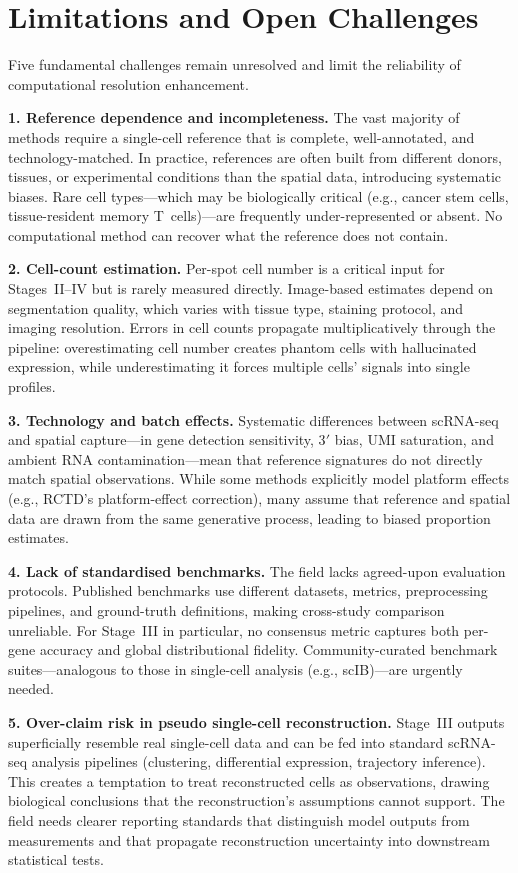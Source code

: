 \section{Limitations and Open Challenges}
\label{sec:limitations}

Five fundamental challenges remain unresolved and limit the reliability of computational resolution enhancement.

\textbf{1. Reference dependence and incompleteness.}
The vast majority of methods require a single-cell reference that is complete, well-annotated, and technology-matched. In practice, references are often built from different donors, tissues, or experimental conditions than the spatial data, introducing systematic biases. Rare cell types---which may be biologically critical (e.g., cancer stem cells, tissue-resident memory T~cells)---are frequently under-represented or absent. No computational method can recover what the reference does not contain.

\textbf{2. Cell-count estimation.}
Per-spot cell number is a critical input for Stages~II--IV but is rarely measured directly. Image-based estimates depend on segmentation quality, which varies with tissue type, staining protocol, and imaging resolution. Errors in cell counts propagate multiplicatively through the pipeline: overestimating cell number creates phantom cells with hallucinated expression, while underestimating it forces multiple cells' signals into single profiles.

\textbf{3. Technology and batch effects.}
Systematic differences between scRNA-seq and spatial capture---in gene detection sensitivity, 3$'$ bias, UMI saturation, and ambient RNA contamination---mean that reference signatures do not directly match spatial observations. While some methods explicitly model platform effects (e.g., RCTD's platform-effect correction), many assume that reference and spatial data are drawn from the same generative process, leading to biased proportion estimates.

\textbf{4. Lack of standardised benchmarks.}
The field lacks agreed-upon evaluation protocols. Published benchmarks use different datasets, metrics, preprocessing pipelines, and ground-truth definitions, making cross-study comparison unreliable. For Stage~III in particular, no consensus metric captures both per-gene accuracy and global distributional fidelity. Community-curated benchmark suites---analogous to those in single-cell analysis (e.g., scIB)---are urgently needed.

\textbf{5. Over-claim risk in pseudo single-cell reconstruction.}
Stage~III outputs superficially resemble real single-cell data and can be fed into standard scRNA-seq analysis pipelines (clustering, differential expression, trajectory inference). This creates a temptation to treat reconstructed cells as observations, drawing biological conclusions that the reconstruction's assumptions cannot support. The field needs clearer reporting standards that distinguish model outputs from measurements and that propagate reconstruction uncertainty into downstream statistical tests.
